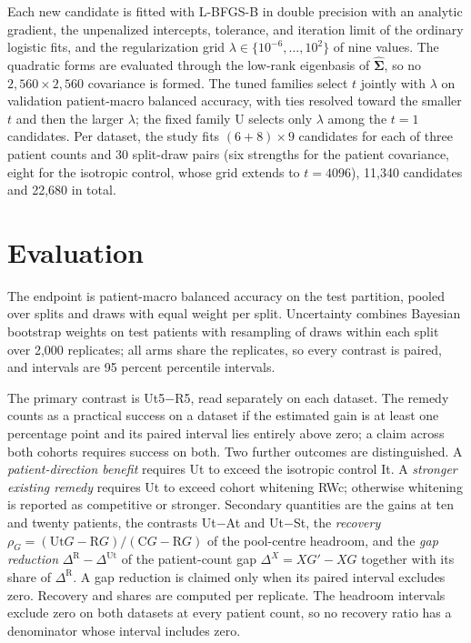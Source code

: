 \documentclass[11pt]{article}
\begin{document}
\noindent Each new candidate is fitted with L-BFGS-B in double precision with an analytic gradient, the unpenalized intercepts, tolerance, and iteration limit of the ordinary logistic fits, and the regularization grid $\lambda\in\{10^{-6},\dots,10^{2}\}$ of nine values. The quadratic forms are evaluated through the low-rank eigenbasis of $\hat{\boldsymbol\Sigma}$, so no $2{,}560\times2{,}560$ covariance is formed. The tuned families select $t$ jointly with $\lambda$ on validation patient-macro balanced accuracy, with ties resolved toward the smaller $t$ and then the larger $\lambda$; the fixed family U selects only $\lambda$ among the $t=1$ candidates. Per dataset, the study fits $(6+8)\times9$ candidates for each of three patient counts and 30 split-draw pairs (six strengths for the patient covariance, eight for the isotropic control, whose grid extends to $t=4096$), 11,340 candidates and 22,680 in total.

\section{Evaluation}
\label{sec:evaluation}
The endpoint is patient-macro balanced accuracy on the test partition, pooled over splits and draws with equal weight per split. Uncertainty combines Bayesian bootstrap weights on test patients \citep{rubin1981bayesian} with resampling of draws within each split over 2,000 replicates; all arms share the replicates, so every contrast is paired, and intervals are 95 percent percentile intervals.

The primary contrast is Ut5$-$R5, read separately on each dataset. The remedy counts as a practical success on a dataset if the estimated gain is at least one percentage point and its paired interval lies entirely above zero; a claim across both cohorts requires success on both. Two further outcomes are distinguished. A \emph{patient-direction benefit} requires Ut to exceed the isotropic control It. A \emph{stronger existing remedy} requires Ut to exceed cohort whitening RWc; otherwise whitening is reported as competitive or stronger. Secondary quantities are the gains at ten and twenty patients, the contrasts Ut$-$At and Ut$-$St, the \emph{recovery} $\rho_G=(\mathrm{Ut}G-\mathrm RG)/(\mathrm CG-\mathrm RG)$ of the pool-centre headroom, and the \emph{gap reduction} $\Delta^{\mathrm R}-\Delta^{\mathrm{Ut}}$ of the patient-count gap $\Delta^X=XG'-XG$ together with its share of $\Delta^{\mathrm R}$. A gap reduction is claimed only when its paired interval excludes zero. Recovery and shares are computed per replicate. The headroom intervals exclude zero on both datasets at every patient count, so no recovery ratio has a denominator whose interval includes zero.





\end{document}
